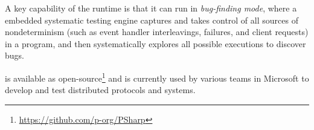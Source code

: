 A key capability of the \psharp runtime is that it can run in \emph{bug-finding mode}, where a embedded systematic testing engine captures and takes control of all sources of nondeterminism (such as event handler interleavings, failures, and client requests) in a \psharp program, and then systematically explores all possible executions to discover bugs.

\psharp is available as open-source\footnote{\url{https://github.com/p-org/PSharp}} and is currently used by various teams in Microsoft to develop and test distributed protocols and systems.

